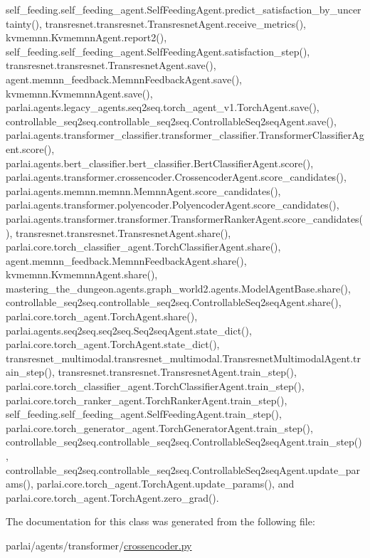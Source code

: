 self\+\_\+feeding.\+self\+\_\+feeding\+\_\+agent.\+Self\+Feeding\+Agent.\+predict\+\_\+satisfaction\+\_\+by\+\_\+uncertainty(), transresnet.\+transresnet.\+Transresnet\+Agent.\+receive\+\_\+metrics(), kvmemnn.\+Kvmemnn\+Agent.\+report2(), self\+\_\+feeding.\+self\+\_\+feeding\+\_\+agent.\+Self\+Feeding\+Agent.\+satisfaction\+\_\+step(), transresnet.\+transresnet.\+Transresnet\+Agent.\+save(), agent.\+memnn\+\_\+feedback.\+Memnn\+Feedback\+Agent.\+save(), kvmemnn.\+Kvmemnn\+Agent.\+save(), parlai.\+agents.\+legacy\+\_\+agents.\+seq2seq.\+torch\+\_\+agent\+\_\+v1.\+Torch\+Agent.\+save(), controllable\+\_\+seq2seq.\+controllable\+\_\+seq2seq.\+Controllable\+Seq2seq\+Agent.\+save(), parlai.\+agents.\+transformer\+\_\+classifier.\+transformer\+\_\+classifier.\+Transformer\+Classifier\+Agent.\+score(), parlai.\+agents.\+bert\+\_\+classifier.\+bert\+\_\+classifier.\+Bert\+Classifier\+Agent.\+score(), parlai.\+agents.\+transformer.\+crossencoder.\+Crossencoder\+Agent.\+score\+\_\+candidates(), parlai.\+agents.\+memnn.\+memnn.\+Memnn\+Agent.\+score\+\_\+candidates(), parlai.\+agents.\+transformer.\+polyencoder.\+Polyencoder\+Agent.\+score\+\_\+candidates(), parlai.\+agents.\+transformer.\+transformer.\+Transformer\+Ranker\+Agent.\+score\+\_\+candidates(), transresnet.\+transresnet.\+Transresnet\+Agent.\+share(), parlai.\+core.\+torch\+\_\+classifier\+\_\+agent.\+Torch\+Classifier\+Agent.\+share(), agent.\+memnn\+\_\+feedback.\+Memnn\+Feedback\+Agent.\+share(), kvmemnn.\+Kvmemnn\+Agent.\+share(), mastering\+\_\+the\+\_\+dungeon.\+agents.\+graph\+\_\+world2.\+agents.\+Model\+Agent\+Base.\+share(), controllable\+\_\+seq2seq.\+controllable\+\_\+seq2seq.\+Controllable\+Seq2seq\+Agent.\+share(), parlai.\+core.\+torch\+\_\+agent.\+Torch\+Agent.\+share(), parlai.\+agents.\+seq2seq.\+seq2seq.\+Seq2seq\+Agent.\+state\+\_\+dict(), parlai.\+core.\+torch\+\_\+agent.\+Torch\+Agent.\+state\+\_\+dict(), transresnet\+\_\+multimodal.\+transresnet\+\_\+multimodal.\+Transresnet\+Multimodal\+Agent.\+train\+\_\+step(), transresnet.\+transresnet.\+Transresnet\+Agent.\+train\+\_\+step(), parlai.\+core.\+torch\+\_\+classifier\+\_\+agent.\+Torch\+Classifier\+Agent.\+train\+\_\+step(), parlai.\+core.\+torch\+\_\+ranker\+\_\+agent.\+Torch\+Ranker\+Agent.\+train\+\_\+step(), self\+\_\+feeding.\+self\+\_\+feeding\+\_\+agent.\+Self\+Feeding\+Agent.\+train\+\_\+step(), parlai.\+core.\+torch\+\_\+generator\+\_\+agent.\+Torch\+Generator\+Agent.\+train\+\_\+step(), controllable\+\_\+seq2seq.\+controllable\+\_\+seq2seq.\+Controllable\+Seq2seq\+Agent.\+train\+\_\+step(), controllable\+\_\+seq2seq.\+controllable\+\_\+seq2seq.\+Controllable\+Seq2seq\+Agent.\+update\+\_\+params(), parlai.\+core.\+torch\+\_\+agent.\+Torch\+Agent.\+update\+\_\+params(), and parlai.\+core.\+torch\+\_\+agent.\+Torch\+Agent.\+zero\+\_\+grad().



The documentation for this class was generated from the following file\+:\begin{DoxyCompactItemize}
\item 
parlai/agents/transformer/\hyperlink{crossencoder_8py}{crossencoder.\+py}\end{DoxyCompactItemize}
